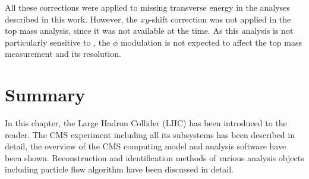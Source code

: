 All these corrections were applied to missing transverse energy in the analyses described in this work. However, the
$xy$-shift correction was not applied in the top mass analysis, since it was not available at the time. As this analysis
is not particularly sensitive to \MET, the $\phi$ modulation is not expected to affect the top mass measurement and its
resolution.

\section{Summary}
In this chapter, the Large Hadron Collider (LHC) has been introduced to the reader. The CMS experiment including all its
subsystems has been described in detail, the overview of the CMS computing model and analysis software have been shown.
Reconstruction and identification methods of various analysis objects including particle flow algorithm have been
discussed in detail.


